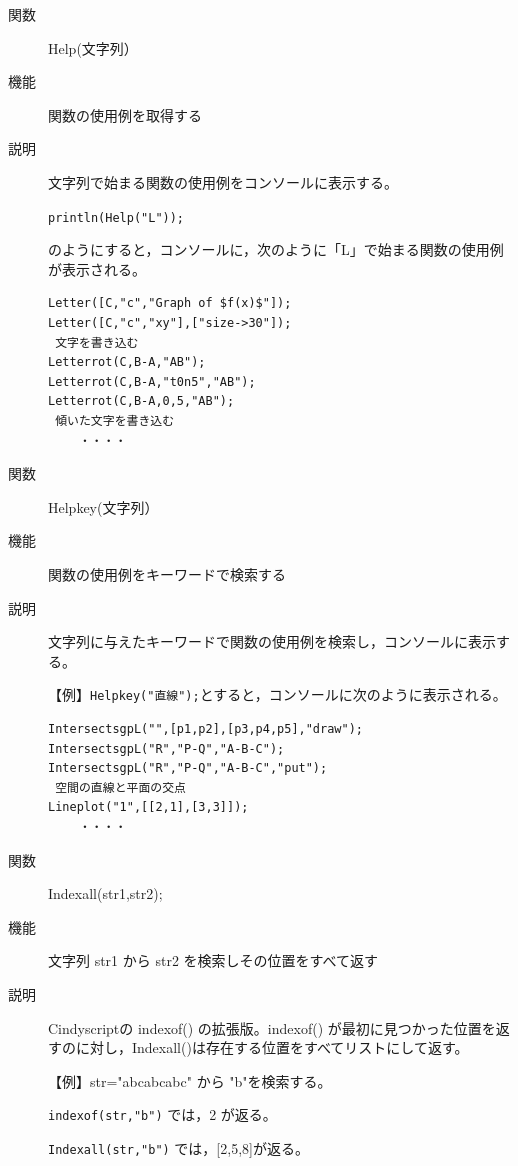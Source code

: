 \documentclass[papersize,a4paper,12pt,uplatex]{jsarticle}
\begin{document}
\begin{description}
\vspace{\baselineskip}
\hypertarget{help}{}
\item[関数]Help(文字列）
\item[機能]関数の使用例を取得する
\item[説明]文字列で始まる関数の使用例をコンソールに表示する。

\hspace{10mm} \verb|println(Help("L"));|

のようにすると，コンソールに，次のように「L」で始まる関数の使用例が表示される。
\begin{verbatim}
Letter([C,"c","Graph of $f(x)$"]); 
Letter([C,"c","xy"],["size->30"]); 
 文字を書き込む 
Letterrot(C,B-A,"AB"); 
Letterrot(C,B-A,"t0n5","AB"); 
Letterrot(C,B-A,0,5,"AB"); 
 傾いた文字を書き込む 
 　　・・・・
\end{verbatim}

\vspace{\baselineskip}
\hypertarget{helpkey}{}
\item[関数]Helpkey(文字列）
\item[機能]関数の使用例をキーワードで検索する
\item[説明]文字列に与えたキーワードで関数の使用例を検索し，コンソールに表示する。

\vspace{\baselineskip}
【例】\verb|Helpkey("直線");|とすると，コンソールに次のように表示される。
\begin{verbatim}
IntersectsgpL("",[p1,p2],[p3,p4,p5],"draw"); 
IntersectsgpL("R","P-Q","A-B-C"); 
IntersectsgpL("R","P-Q","A-B-C","put");
 空間の直線と平面の交点
Lineplot("1",[[2,1],[3,3]]);
 　　・・・・
\end{verbatim}

\vspace{\baselineskip}
\hypertarget{indexall}{}
\item[関数]Indexall(str1,str2);
\item[機能]文字列 str1 から str2 を検索しその位置をすべて返す
\item[説明]Cindyscriptの indexof() の拡張版。indexof() が最初に見つかった位置を返すのに対し，Indexall()は存在する位置をすべてリストにして返す。

\vspace{\baselineskip}
【例】str="abcabcabc" から "b"を検索する。

\verb|indexof(str,"b")| では，2 が返る。

\verb|Indexall(str,"b")| では，[2,5,8]が返る。


\end{description}
\end{document}
